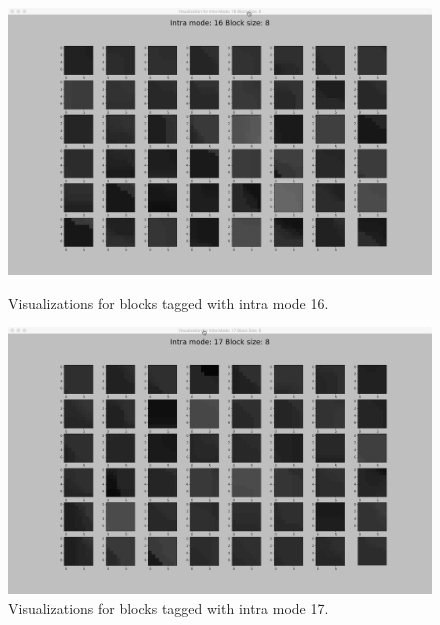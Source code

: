     \begin{figure}
    
        \vspace*{1cm} %
    
        \begin{minipage}{0.49\textwidth}
            \includegraphics[width=\linewidth]{Figures/visu-size8x8/8-16}
            \caption[Visualizations for blocks tagged with intra mode 16]{Visualizations for blocks tagged with intra mode 16.}
            \label{fig:size8_mode16}
        \end{minipage}
        \hspace{\fill} %
        \begin{minipage}{0.49\textwidth}
            \includegraphics[width=\linewidth]{Figures/visu-size8x8/8-17}
            \caption[Visualizations for blocks tagged with intra mode 17]{Visualizations for blocks tagged with intra mode 17.}
            \label{fig:size8_mode17}
        \end{minipage}
    

\end{figure}
